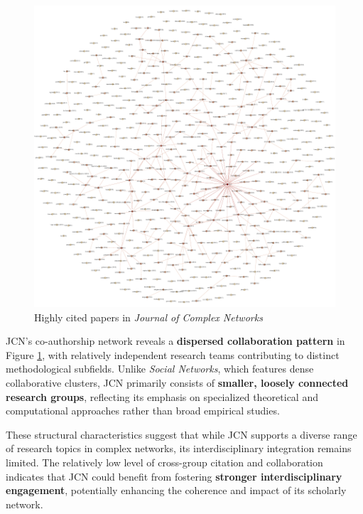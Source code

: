 \documentclass[twocolumn]{article}
\begin{document}
	\begin{figure}[htbp]
		\centering
		\includegraphics[width=\columnwidth]{"Journal of Complex Networks/Gephi/highly_cited.pdf"}
		\caption{Highly cited papers in \textit{Journal of Complex Networks}}
		\label{fig.fig6}
	\end{figure}
	
	JCN's co-authorship network reveals a \textbf{dispersed collaboration pattern} in Figure \ref{fig.fig6}, with relatively independent research teams contributing to distinct methodological subfields. Unlike \textit{Social Networks}, which features dense collaborative clusters, JCN primarily consists of \textbf{smaller, loosely connected research groups}, reflecting its emphasis on specialized theoretical and computational approaches rather than broad empirical studies.
	
	These structural characteristics suggest that while JCN supports a diverse range of research topics in complex networks, its interdisciplinary integration remains limited. The relatively low level of cross-group citation and collaboration indicates that JCN could benefit from fostering \textbf{stronger interdisciplinary engagement}, potentially enhancing the coherence and impact of its scholarly network.
	
\end{document}

